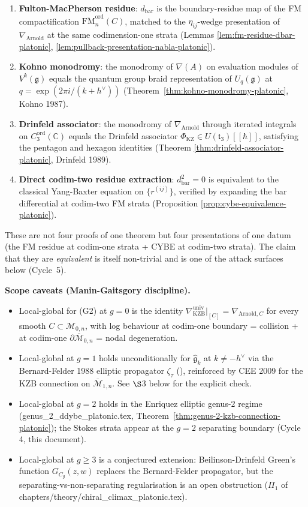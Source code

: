 \documentclass[12pt]{article}
\providecommand{\KZ}{\mathrm{KZ}}
\providecommand{\KZB}{\mathrm{KZB}}
\providecommand{\Arn}{\mathrm{Arnold}}
\providecommand{\Conf}{C}
\providecommand{\FM}{\overline{\mathrm{FM}}}
\providecommand{\Mbar}{\overline{\mathcal{M}}}
\providecommand{\dbar}{d_{\mathrm{bar}}}
\providecommand{\fg}{\mathfrak{g}}
\providecommand{\hv}{h^{\vee}}
\theoremstyle{definition}
\begin{document}
\begin{enumerate}[label=\textup{(P\arabic*)}]
\item \textbf{Fulton-MacPherson residue}:
   $\dbar$ is the boundary-residue map of the FM compactification
   $\FM_n^{\mathrm{ord}}(C)$, matched to the
   $\eta_{ij}$-wedge presentation of $\nabla_{\Arn}$ at the
   same codimension-one strata
   (Lemmas \ref{lem:fm-residue-dbar-platonic},
   \ref{lem:pullback-presentation-nabla-platonic}).
\item \textbf{Kohno monodromy}:
   the monodromy of $\nabla(A)$ on evaluation modules of
   $V^{k}(\fg)$ equals the quantum group braid representation
   of $U_{q}(\fg)$ at $q = \exp(2\pi i/(k+\hv))$
   (Theorem~\ref{thm:kohno-monodromy-platonic}, Kohno 1987).
\item \textbf{Drinfeld associator}:
   the monodromy of $\nabla_{\Arn}$ through iterated integrals
   on $\Conf_3^{\mathrm{ord}}(\mathbb{C})$ equals the Drinfeld
   associator $\Phi_{\KZ} \in U(\mathfrak{t}_3)[[\hbar]]$,
   satisfying the pentagon and hexagon identities
   (Theorem \ref{thm:drinfeld-associator-platonic},
   Drinfeld 1989).
\item \textbf{Direct codim-two residue extraction}:
   $\dbar^{2} = 0$ is equivalent to the classical Yang-Baxter
   equation on $\{r^{(ij)}\}$, verified by expanding the bar
   differential at codim-two FM strata
   (Proposition \ref{prop:cybe-equivalence-platonic}).
\end{enumerate}

These are not four proofs of one theorem but four presentations
of one datum (the FM residue at codim-one strata + CYBE at
codim-two strata).  The claim that they are \emph{equivalent} is
itself non-trivial and is one of the attack surfaces below
(Cycle~5).

\textbf{Scope caveats (Manin-Gaitsgory discipline).}
\begin{itemize}
\item Local-global for (G2) at $g = 0$ is the identity
   $\nabla_{\KZB}^{\mathrm{univ}}|_{[C]} = \nabla_{\Arn,C}$ for
   every smooth $C \subset \mathcal{M}_{0,n}$, with log
   behaviour at codim-one boundary = collision + at codim-one
   $\partial \Mbar_{0,n}$ = nodal degeneration.
\item Local-global at $g = 1$ holds unconditionally for
   $\widehat{\fg}_k$ at $k \neq -\hv$ via the Bernard-Felder
   1988 elliptic propagator $\zeta_\tau$ (\cite{Bernard88}),
   reinforced by CEE 2009 for the KZB connection on
   $\Mbar_{1,n}$.  See $\S$3 below for the explicit check.
\item Local-global at $g = 2$ holds in the Enriquez elliptic
   genus-$2$ regime (genus\_2\_ddybe\_platonic.tex,
   Theorem~\ref{thm:genus-2-kzb-connection-platonic}); the
   Stokes strata appear at the $g = 2$ separating boundary
   (Cycle 4, this document).
\item Local-global at $g \geq 3$ is a conjectured extension:
   Beilinson-Drinfeld Green's function
   $G_{C_g}(z, w)$ replaces the Bernard-Felder propagator, but
   the separating-vs-non-separating regularisation is an open
   obstruction ($\Pi_1$ of
   chapters/theory/chiral\_climax\_platonic.tex).
\end{itemize}
\end{document}
